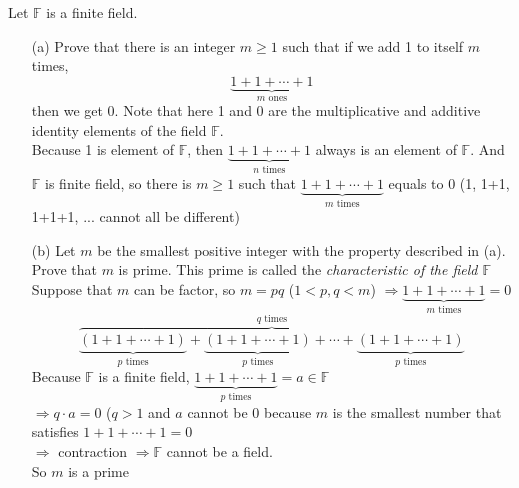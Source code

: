 \begin{exer}[2.41] Let $\mathbb{F}$ is a finite field.

\begin{enumerate}
    \item [(a)] Prove that there is an integer $m \geq 1$ such that if we add 1 to itself $m$ times, \[\underbrace{1+1+\cdots+1}_{m \text{ ones}} \] then we get 0. Note that here 1 and 0 are the multiplicative and additive identity elements of the field $\mathbb{F}$. \\ Because 1 is element of $\mathbb{F}$, then $\underbrace{1+1+\cdots+1}_{n \text{ times}}$ always is an element of $\mathbb{F}$. And $\mathbb{F}$ is finite field, so there is $m \geq 1$ such that $\underbrace{1+1+\cdots+1}_{m \text{ times}}$ equals to 0 (1, 1+1, 1+1+1, ... cannot all be different)
    \item [(b)] Let $m$ be the smallest positive integer with the property described in (a). Prove that $m$ is prime. This prime is called the \textit{characteristic of the field $\mathbb{F}$} \\ Suppose that $m$ can be factor, so $m=pq$ ($1 < p, q < m$) $\Rightarrow \underbrace{1+1+\cdots+1}_{m \text{ times}} = 0$ \[ \overbrace{\underbrace{(1+1+\cdots+1)}_{p \text{ times}} + \underbrace{(1+1+\cdots+1)}_{p \text{ times}} + \cdots + \underbrace{(1+1+\cdots+1)}_{p \text{ times}}}^{q \text{ times}}\] Because $\mathbb{F}$ is a finite field, $\underbrace{1+1+\cdots+1}_{p \text{ times}} = a \in \mathbb{F}$ \\ $\Rightarrow q \cdot a = 0$ ($q > 1$ and $a$ cannot be 0 because $m$ is the smallest number that satisfies $1+1+\cdots+1=0$ \\ $\Rightarrow$ contraction $\Rightarrow \mathbb{F}$ cannot be a field. \\ So $m$ is a prime 
\end{enumerate}

\end{exer}